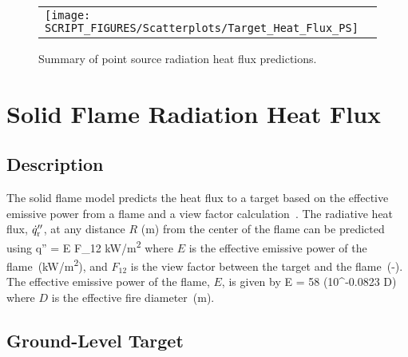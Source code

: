 \begin{figure}[!ht]
\begin{center}
\begin{tabular}{l}
\texttt{[image: SCRIPT\_FIGURES/Scatterplots/Target\_Heat\_Flux\_PS]}
\end{tabular}
\end{center}
\caption[Summary of point source radiation heat flux predictions]
{Summary of point source radiation heat flux predictions.}
\label{Heat_Flux_Point_Source_Summary}
\end{figure}


\clearpage


\section{Solid Flame Radiation Heat Flux}

\subsection*{Description}

The solid flame model predicts the heat flux to a target based on the effective emissive power from a flame and a view factor calculation~\cite{Beyler2:SFPE}.
The radiative heat flux, $\dot q''\sb{r}$, at any distance $R$ (\si{m}) from the center of the flame can be predicted using
\be
\dot q'' = E F_{12} \quad \si{kW/m^2}
\label{eq:solid_flame}
\ee
where $E$ is the effective emissive power of the flame~(\si{kW/m^2}), and $F_{12}$ is the view factor between the target and the flame~(-).
The effective emissive power of the flame, $E$, is given by
\be
E = 58 (10^{-0.0823 D})
\label{eq:solid_flame_E}
\ee
where $D$ is the effective fire diameter~(\si{m}).

\subsection*{Ground-Level Target}

